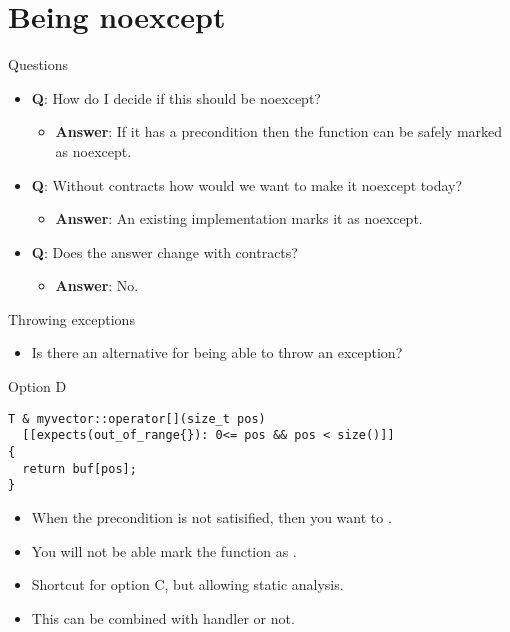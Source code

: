 \section{Being noexcept}

\begin{frame}[t]{Questions}
\begin{itemize}
  \item \textbf{Q}: 
        How do I decide if this should be noexcept?
    \begin{itemize}
      \item \textbf{Answer}: 
            If it has a precondition then the function can be safely marked as noexcept.
    \end{itemize}

  \vfill\pause
  \item \textbf{Q}: 
      Without contracts how would we want to make it noexcept today?
    \begin{itemize}
      \item \textbf{Answer}: 
            An existing implementation marks it as noexcept.
    \end{itemize}

  \vfill\pause
  \item \textbf{Q}: 
        Does the answer change with contracts?
    \begin{itemize}
      \item \textbf{Answer}: 
            No.
    \end{itemize}
\end{itemize}
\end{frame}

\begin{frame}[t,fragile]{Throwing exceptions}
\begin{itemize}
  \item Is there an alternative for being able to throw an exception?
\end{itemize}
\begin{block}{Option D}
\begin{lstlisting}[basicstyle=\footnotesize]
T & myvector::operator[](size_t pos)
  [[expects(out_of_range{}): 0<= pos && pos < size()]]
{
  return buf[pos];
}
\end{lstlisting}
\end{block}
\begin{itemize}
  \item When the precondition is
        not satisified, then you want to  .

  \item You will not be able mark the function as . 

  \item Shortcut for option C, but allowing static analysis. 

  \item This can be combined with handler or not.
\end{itemize}
\end{frame}
